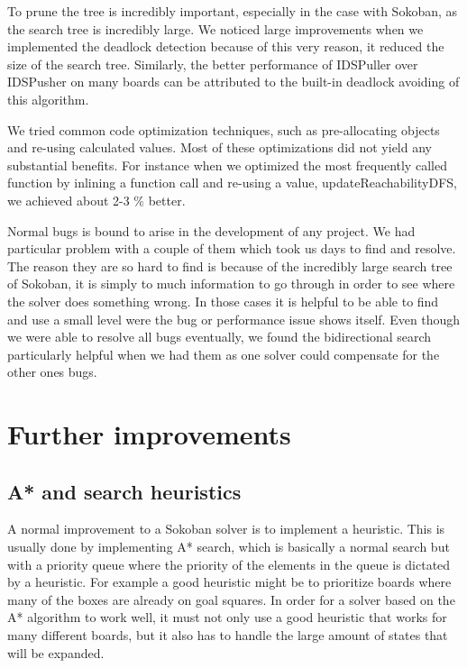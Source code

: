 \documentclass[a4paper,11pt]{article}
\renewcommand{\*}[0]{\cdot}
\begin{document}
To prune the tree is incredibly important, especially in the case with Sokoban,
as the search tree is incredibly large. We noticed large improvements when we
implemented the deadlock detection because of this very reason, it reduced the
size of the search tree. Similarly, the better performance of IDSPuller over
IDSPusher on many boards can be attributed to the built-in deadlock avoiding of
this algorithm.

We tried common code optimization techniques, such as pre-allocating objects and
re-using calculated values. Most of these optimizations did not yield any
substantial benefits. For instance when we optimized the most frequently called
function by inlining a function call and re-using a value,
updateReachabilityDFS, we achieved about 2-3 \% better.


Normal bugs is bound to arise in the development of any project. We had
particular problem with a couple of them which took us days to find and resolve.
The reason they are so hard to find is because of the incredibly large search
tree of Sokoban, it is simply to much information to go through in order to see
where the solver does something wrong. In those cases it is helpful to be able
to find and use a small level were the bug or performance issue shows itself.
Even though we were able to resolve all bugs eventually, we found the
bidirectional search particularly helpful when we had them as one solver could
compensate for the other ones bugs.


\section{Further improvements}

\subsection{A* and search heuristics}

A normal improvement to a Sokoban solver is to implement a heuristic. This is
usually done by implementing A* search, which is basically a normal search but
with a priority queue where the priority of the elements in the queue is
dictated by a heuristic. For example a good heuristic might be to prioritize
boards where many of the boxes are already on goal squares. In order for a
solver based on the A* algorithm to work well, it must not only use a good
heuristic that works for many different boards, but it also has to handle the
large amount of states that will be expanded.
\end{document}
